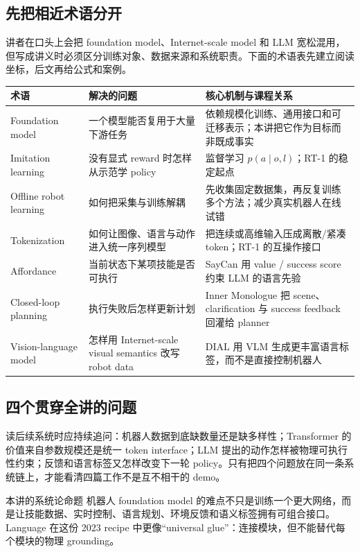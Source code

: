 \documentclass[a4paper]{article}
\begin{document}
\subsection{先把相近术语分开}

讲者在口头上会把 foundation model、Internet-scale model 和 LLM 宽松混用，但写成讲义时必须区分训练对象、数据来源和系统职责。下面的术语表先建立阅读坐标，后文再给公式和案例。

\begin{longtable}{L{0.22\textwidth}L{0.30\textwidth}L{0.38\textwidth}}
\toprule
术语 & 解决的问题 & 核心机制与课程关系 \\
\midrule
Foundation model & 一个模型能否复用于大量下游任务 & 依赖规模化训练、通用接口和可迁移表示；本讲把它作为目标而非既成事实 \\
Imitation learning & 没有显式 reward 时怎样从示范学 policy & 监督学习 $p(a\mid o,l)$；RT-1 的稳定起点 \\
Offline robot learning & 如何把采集与训练解耦 & 先收集固定数据集，再反复训练多个方法；减少真实机器人在线试错 \\
Tokenization & 如何让图像、语言与动作进入统一序列模型 & 把连续或高维输入压成离散/紧凑 token；RT-1 的互操作接口 \\
Affordance & 当前状态下某项技能是否可执行 & SayCan 用 value / success score 约束 LLM 的语言先验 \\
Closed-loop planning & 执行失败后怎样更新计划 & Inner Monologue 把 scene、clarification 与 success feedback 回灌给 planner \\
Vision-language model & 怎样用 Internet-scale visual semantics 改写 robot data & DIAL 用 VLM 生成更丰富语言标签，而不是直接控制机器人 \\
\bottomrule
\end{longtable}

\subsection{四个贯穿全讲的问题}

读后续系统时应持续追问：机器人数据到底缺数量还是缺多样性；Transformer 的价值来自参数规模还是统一 token interface；LLM 提出的动作怎样被物理可执行性约束；反馈和语言标签又怎样改变下一轮 policy。只有把四个问题放在同一条系统链上，才能看清四篇工作不是互不相干的 demo。

\begin{importantbox}{本讲的系统论命题}
机器人 foundation model 的难点不只是训练一个更大网络，而是让技能数据、实时控制、语言规划、环境反馈和语义标签拥有可组合接口。Language 在这份 2023 recipe 中更像“universal glue”：连接模块，但不能替代每个模块的物理 grounding。
\end{importantbox}
\end{document}
